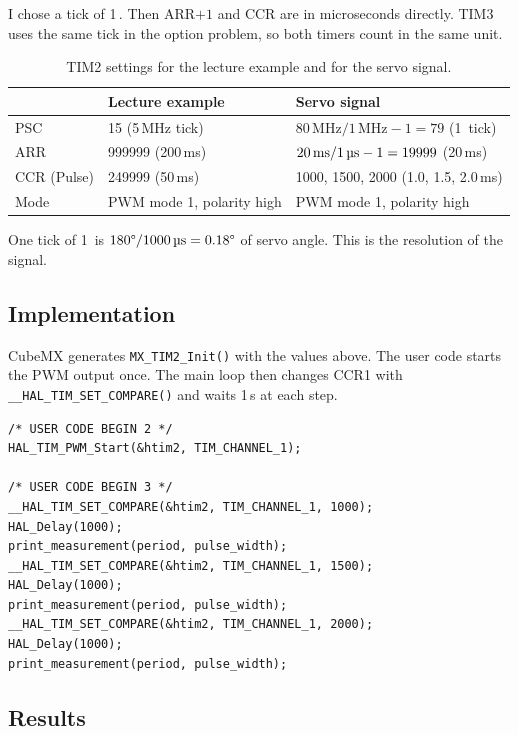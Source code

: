 \documentclass[11pt,a4paper]{article}
\newcommand{\us}{\,\text{\textmu s}}
\newcommand{\dg}{\text{\textdegree}}
\begin{document}
I chose a tick of 1\us. Then ARR$+1$ and CCR are in microseconds directly.
TIM3 uses the same tick in the option problem, so both timers count in the
same unit.

\begin{table}[h]
\centering
\caption{TIM2 settings for the lecture example and for the servo signal.}
\begin{tabular}{@{}lll@{}}
\toprule
 & Lecture example & Servo signal \\
\midrule
PSC          & 15 (5\,MHz tick)        & $80\,\text{MHz}/1\,\text{MHz} - 1 = 79$ (1\us{} tick) \\
ARR          & 999999 (200\,ms)        & $20\,\text{ms}/1\us - 1 = 19999$ (20\,ms) \\
CCR (Pulse)  & 249999 (50\,ms)         & 1000, 1500, 2000 (1.0, 1.5, 2.0\,ms) \\
Mode         & PWM mode 1, polarity high & PWM mode 1, polarity high \\
\bottomrule
\end{tabular}
\end{table}

One tick of 1\us{} is $180\dg / 1000\us = 0.18\dg$ of servo angle. This is
the resolution of the signal.

\subsection{Implementation}

CubeMX generates \texttt{MX\_TIM2\_Init()} with the values above. The user
code starts the PWM output once. The main loop then changes CCR1 with
\texttt{\_\_HAL\_TIM\_SET\_COMPARE()} and waits 1\,s at each step.

\begin{lstlisting}[caption={Starting the PWM and stepping the pulse width (\texttt{main.c}, user code blocks 2 and 3). The \texttt{print\_measurement()} calls belong to the option problem.}]
/* USER CODE BEGIN 2 */
HAL_TIM_PWM_Start(&htim2, TIM_CHANNEL_1);

/* USER CODE BEGIN 3 */
__HAL_TIM_SET_COMPARE(&htim2, TIM_CHANNEL_1, 1000);
HAL_Delay(1000);
print_measurement(period, pulse_width);
__HAL_TIM_SET_COMPARE(&htim2, TIM_CHANNEL_1, 1500);
HAL_Delay(1000);
print_measurement(period, pulse_width);
__HAL_TIM_SET_COMPARE(&htim2, TIM_CHANNEL_1, 2000);
HAL_Delay(1000);
print_measurement(period, pulse_width);
\end{lstlisting}

\subsection{Results}
\end{document}
